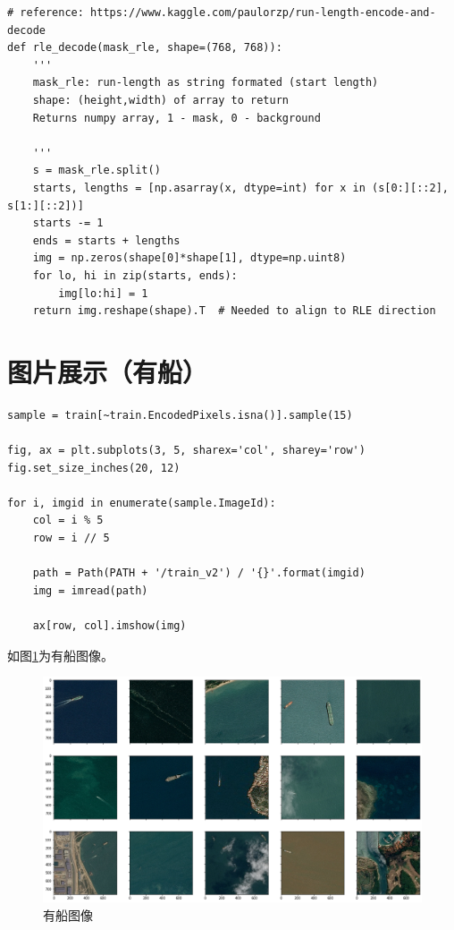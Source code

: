 \begin{lstlisting}
# reference: https://www.kaggle.com/paulorzp/run-length-encode-and-decode
def rle_decode(mask_rle, shape=(768, 768)):
    '''
    mask_rle: run-length as string formated (start length)
    shape: (height,width) of array to return 
    Returns numpy array, 1 - mask, 0 - background

    '''
    s = mask_rle.split()
    starts, lengths = [np.asarray(x, dtype=int) for x in (s[0:][::2], s[1:][::2])]
    starts -= 1
    ends = starts + lengths
    img = np.zeros(shape[0]*shape[1], dtype=np.uint8)
    for lo, hi in zip(starts, ends):
        img[lo:hi] = 1
    return img.reshape(shape).T  # Needed to align to RLE direction
\end{lstlisting}

\section{图片展示（有船）}\label{ux56feux7247ux5c55ux793aux6709ux8239}

\begin{lstlisting}
sample = train[~train.EncodedPixels.isna()].sample(15)

fig, ax = plt.subplots(3, 5, sharex='col', sharey='row')
fig.set_size_inches(20, 12)

for i, imgid in enumerate(sample.ImageId):
    col = i % 5
    row = i // 5
    
    path = Path(PATH + '/train_v2') / '{}'.format(imgid)
    img = imread(path)
    
    ax[row, col].imshow(img)
\end{lstlisting}

如图\ref{fig::EDA5}为有船图像。

\begin{figure}[htbp]
\centering
\includegraphics[width=1\linewidth]{body/EDA_pic/EDA_7_0}
\caption{有船图像}
\label{fig::EDA5}
\end{figure}

